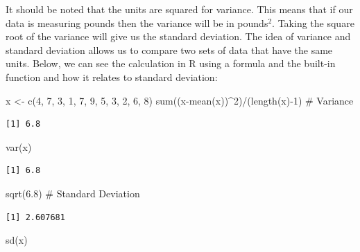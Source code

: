 \documentclass[
  letterpaper,
  DIV=11,
  numbers=noendperiod]{scrreprt}
\newenvironment{Shaded}{\begin{snugshade}}{\end{snugshade}}
\newcommand{\CommentTok}[1]{\textcolor[rgb]{0.37,0.37,0.37}{#1}}
\newcommand{\DecValTok}[1]{\textcolor[rgb]{0.68,0.00,0.00}{#1}}
\newcommand{\FloatTok}[1]{\textcolor[rgb]{0.68,0.00,0.00}{#1}}
\newcommand{\FunctionTok}[1]{\textcolor[rgb]{0.28,0.35,0.67}{#1}}
\newcommand{\NormalTok}[1]{\textcolor[rgb]{0.00,0.23,0.31}{#1}}
\newcommand{\OtherTok}[1]{\textcolor[rgb]{0.00,0.23,0.31}{#1}}
\newcommand{\SpecialCharTok}[1]{\textcolor[rgb]{0.37,0.37,0.37}{#1}}
\begin{document}
It should be noted that the units are squared for variance. This means
that if our data is measuring pounds then the variance will be in
pounds\(^2\). Taking the square root of the variance will give us the
standard deviation. The idea of variance and standard deviation allows
us to compare two sets of data that have the same units. Below, we can
see the calculation in R using a formula and the built-in function and
how it relates to standard deviation:

\begin{Shaded}
\begin{Highlighting}[]
\NormalTok{x }\OtherTok{\textless{}{-}} \FunctionTok{c}\NormalTok{(}\DecValTok{4}\NormalTok{, }\DecValTok{7}\NormalTok{, }\DecValTok{3}\NormalTok{, }\DecValTok{1}\NormalTok{, }\DecValTok{7}\NormalTok{, }\DecValTok{9}\NormalTok{, }\DecValTok{5}\NormalTok{, }\DecValTok{3}\NormalTok{, }\DecValTok{2}\NormalTok{, }\DecValTok{6}\NormalTok{, }\DecValTok{8}\NormalTok{)}
\FunctionTok{sum}\NormalTok{((x}\SpecialCharTok{{-}}\FunctionTok{mean}\NormalTok{(x))}\SpecialCharTok{\^{}}\DecValTok{2}\NormalTok{)}\SpecialCharTok{/}\NormalTok{(}\FunctionTok{length}\NormalTok{(x)}\SpecialCharTok{{-}}\DecValTok{1}\NormalTok{) }\CommentTok{\# Variance}
\end{Highlighting}
\end{Shaded}

\begin{verbatim}
[1] 6.8
\end{verbatim}

\begin{Shaded}
\begin{Highlighting}[]
\FunctionTok{var}\NormalTok{(x)}
\end{Highlighting}
\end{Shaded}

\begin{verbatim}
[1] 6.8
\end{verbatim}

\begin{Shaded}
\begin{Highlighting}[]
\FunctionTok{sqrt}\NormalTok{(}\FloatTok{6.8}\NormalTok{) }\CommentTok{\# Standard Deviation}
\end{Highlighting}
\end{Shaded}

\begin{verbatim}
[1] 2.607681
\end{verbatim}

\begin{Shaded}
\begin{Highlighting}[]
\FunctionTok{sd}\NormalTok{(x)}
\end{Highlighting}
\end{Shaded}
\end{document}
